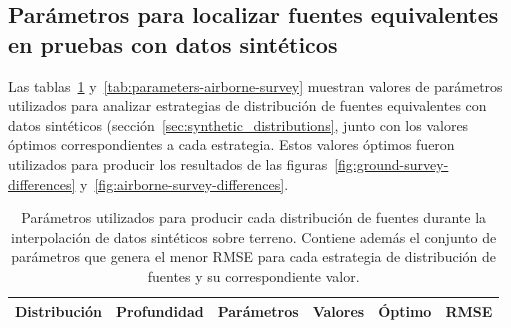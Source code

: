 
\begin{subappendices}

\section[%
    Parámetros para localizar fuentes equivalentes en pruebas con datos sintéticos
]{%
    Parámetros para localizar fuentes equivalentes en pruebas con datos sintéticos
}

\label{sec:sources}

Las tablas~\ref{tab:parameters-ground-survey}
y~\ref{tab:parameters-airborne-survey} muestran valores de parámetros
utilizados para analizar estrategias de distribución de fuentes equivalentes
con datos sintéticos (sección~\ref{sec:synthetic_distributions}, junto con los
valores óptimos correspondientes a cada estrategia.
Estos valores óptimos fueron utilizados para producir los resultados de las
figuras~\ref{fig:ground-survey-differences}
y~\ref{fig:airborne-survey-differences}.

{\renewcommand\normalsize{\scriptsize}%
\normalsize

\begin{table}[h]
    \centering
    \caption{
        Parámetros utilizados para producir cada distribución de fuentes
        durante la interpolación de datos sintéticos sobre terreno.
        Contiene además el conjunto de parámetros que genera el menor
        \acs{RMSE} para cada estrategia de distribución de fuentes y su
        correspondiente valor.
    }
    \label{tab:parameters-ground-survey}
    \begin{tabular}{c c l c c c}
        \textbf{Distribución}
            & \textbf{Profundidad}
            & \multicolumn{1}{c}{\textbf{Parámetros}}
            & \textbf{Valores}
            & \textbf{Óptimo}
            & \textbf{RMSE} \\
        \toprule


\end{tabular}
\end{table}}
\end{subappendices}
